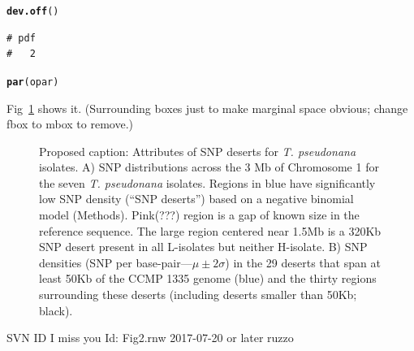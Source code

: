 \documentclass{article}\usepackage[]{graphicx}\usepackage[]{color}
\makeatletter
\newcommand{\hlstd}[1]{\textcolor[rgb]{0.345,0.345,0.345}{#1}}%
\newcommand{\hlkwd}[1]{\textcolor[rgb]{0.737,0.353,0.396}{\textbf{#1}}}%
\newenvironment{kframe}{%
 \def\at@end@of@kframe{}%
 \ifinner\ifhmode%
  \def\at@end@of@kframe{\end{minipage}}%
  \begin{minipage}{\columnwidth}%
 \fi\fi%
 \def\FrameCommand##1{\hskip\@totalleftmargin \hskip-\fboxsep
 \colorbox{shadecolor}{##1}\hskip-\fboxsep
     \hskip-\linewidth \hskip-\@totalleftmargin \hskip\columnwidth}%
 \MakeFramed {\advance\hsize-\width
   \@totalleftmargin\z@ \linewidth\hsize
   \@setminipage}}%
 {\par\unskip\endMakeFramed%
 \at@end@of@kframe}
\newenvironment{knitrout}{}{} %
\makeatother
\begin{document}
\begin{knitrout}
\begin{kframe}
\begin{alltt}
\hlkwd{dev.off}\hlstd{()}
\end{alltt}
\begin{verbatim}
# pdf 
#   2
\end{verbatim}
\begin{alltt}
\hlkwd{par}\hlstd{(opar)}
\end{alltt}
\end{kframe}
\end{knitrout}

Fig~\ref{fig:2a2b} shows it.  (Surrounding boxes just to make marginal space obvious; change fbox to mbox to remove.)
\begin{figure}
  \begin{center}
  \end{center}
  \caption{Proposed caption: Attributes of SNP deserts for {\it T. pseudonana\/} isolates. A) SNP distributions across the 3 Mb of Chromosome 1 for the seven {\it T. pseudonana\/} isolates. Regions in blue have significantly low SNP density (``SNP deserts'') based on a negative binomial model (Methods). Pink(???) region is a gap of known size in the reference sequence. The large region centered near 1.5Mb is a 320Kb SNP desert present in all L-isolates but neither H-isolate. B) SNP densities (SNP per base-pair---$\mu\pm2\sigma$) in the 29 deserts that span at least 50Kb of the CCMP 1335 genome (blue) and the thirty regions surrounding these deserts (including deserts smaller than 50Kb; black).  }
  \label{fig:2a2b}
\end{figure}

\vfill\footnotesize\flushright SVN ID I miss you $ $Id: Fig2.rnw 2017-07-20 or later ruzzo $ $
\end{document}
